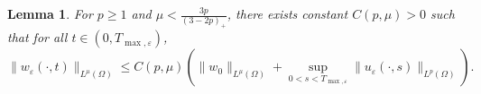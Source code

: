 \documentclass[12pt]{article}
\theoremstyle{plain}
\newtheorem{lemma}{Lemma}[section]
\theoremstyle{definition}
\numberwithin{equation}{section}
\begin{document}
\begin{lemma}\label{lemma2.4}
For $p\geq 1$ and  $\mu<\frac{3p}{(3-2p)_+}$, %
there exists constant $C(p,\mu)>0$ such that for all $t\in(0,T_{\max,\varepsilon})$,
\begin{equation}\label{2.14}
    \|w_\varepsilon(\cdot,t)\|_{L^{\mu}(\Omega)}\leq C(p,\mu)(\|w_{0}\|_{L^{\mu}(\Omega)}+\sup\limits_{0<s<T_{\max,\varepsilon}}\|u_\varepsilon(\cdot,s)\|_{L^p(\Omega)}).
\end{equation}

\end{lemma}
\end{document}

